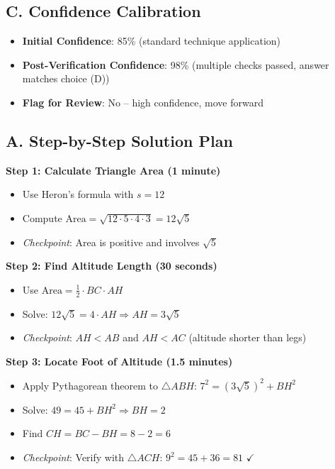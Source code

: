 \documentclass[12pt]{article}
\begin{document}
\begin{verificationbox}
\subsection*{C. Confidence Calibration}
\begin{itemize}[leftmargin=*]
    \item \textbf{Initial Confidence}: 85\% (standard technique application)
    \item \textbf{Post-Verification Confidence}: 98\% (multiple checks passed, answer matches choice (D))
    \item \textbf{Flag for Review}: No -- high confidence, move forward
\end{itemize}
\end{verificationbox}

\begin{roadmapbox}
\subsection*{A. Step-by-Step Solution Plan}

\textbf{Step 1: Calculate Triangle Area (1 minute)}
\begin{itemize}
    \item Use Heron's formula with $s = 12$
    \item Compute $\text{Area} = \sqrt{12 \cdot 5 \cdot 4 \cdot 3} = 12\sqrt{5}$
    \item \textit{Checkpoint}: Area is positive and involves $\sqrt{5}$
\end{itemize}

\textbf{Step 2: Find Altitude Length (30 seconds)}
\begin{itemize}
    \item Use $\text{Area} = \frac{1}{2} \cdot BC \cdot AH$
    \item Solve: $12\sqrt{5} = 4 \cdot AH \Rightarrow AH = 3\sqrt{5}$
    \item \textit{Checkpoint}: $AH < AB$ and $AH < AC$ (altitude shorter than legs)
\end{itemize}

\textbf{Step 3: Locate Foot of Altitude (1.5 minutes)}
\begin{itemize}
    \item Apply Pythagorean theorem to $\triangle ABH$: $7^2 = (3\sqrt{5})^2 + BH^2$
    \item Solve: $49 = 45 + BH^2 \Rightarrow BH = 2$
    \item Find $CH = BC - BH = 8 - 2 = 6$
    \item \textit{Checkpoint}: Verify with $\triangle ACH$: $9^2 = 45 + 36 = 81$ $\checkmark$
\end{itemize}


\end{roadmapbox}
\end{document}
